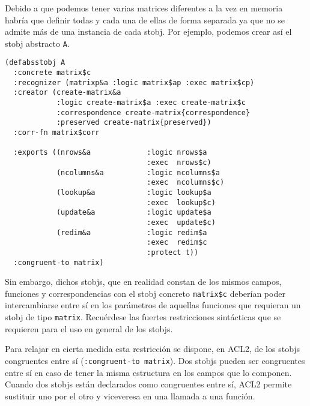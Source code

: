 \documentclass[a4paper,10pt]{article}
\begin{document}
Debido a que podemos tener varias matrices diferentes a la vez en memoria habría que definir todas y cada una de ellas de forma separada
ya que no se admite más de una instancia de cada stobj. Por ejemplo, podemos crear así el stobj abstracto \texttt{A}.

\par \vspace{10pt}

\newpage
\begin{lstlisting}[language=clips]
(defabsstobj A
  :concrete matrix$c
  :recognizer (matrixp&a :logic matrix$ap :exec matrix$cp)
  :creator (create-matrix&a
            :logic create-matrix$a :exec create-matrix$c
            :correspondence create-matrix{correspondence}
            :preserved create-matrix{preserved})
  :corr-fn matrix$corr
  
  :exports ((nrows&a             :logic nrows$a
                                 :exec  nrows$c)
            (ncolumns&a          :logic ncolumns$a
                                 :exec  ncolumns$c)
            (lookup&a            :logic lookup$a
                                 :exec  lookup$c)
            (update&a            :logic update$a
                                 :exec  update$c)
            (redim&a             :logic redim$a
                                 :exec  redim$c
                                 :protect t))
  :congruent-to matrix)
\end{lstlisting}

\par \vspace{10pt}

Sin embargo, dichos stobjs, que en realidad constan de los mismos campos, funciones y correspondencias con el stobj concreto \texttt{matrix\$c} deberían poder intercambiarse entre sí en los parámetros de aquellas funciones que requieran un stobj de tipo \texttt{matrix}. Recuérdese las fuertes restricciones sintácticas que se requieren para el uso en general de los stobjs.

\par \vspace{10pt}

Para relajar en cierta medida esta restricción se dispone, en ACL2, de los stobjs congruentes entre sí (\texttt{:congruent-to matrix}). Dos stobjs pueden ser congruentes entre sí en caso de tener la misma estructura en los campos que lo componen. Cuando dos stobjs están declarados como congruentes entre sí, ACL2 permite sustituir uno por el otro y viceveresa en una llamada a una función. 
\end{document}
